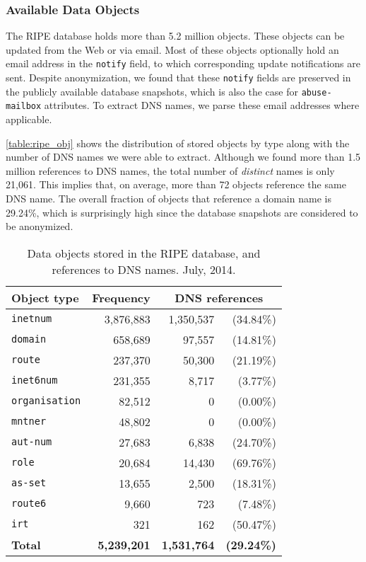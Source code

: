 \documentclass{llncs}
\let\orgautoref\autoref
\renewcommand{\autoref}
{\def\sectionautorefname{Section}\orgautoref}
\begin{document}
\subsubsection{Available Data Objects}
The RIPE database holds more than 5.2 million objects. These objects can be updated from the Web or via email. Most of these objects optionally hold an email address in the \texttt{notify} field, to which corresponding update notifications are sent. Despite anonymization, we found that these \texttt{notify} fields are preserved in the publicly available database snapshots, which is also the case for \texttt{abuse-mailbox} attributes. To extract DNS names, we parse these email addresses where applicable.

\autoref{table:ripe_obj} shows the distribution of stored objects by type along with the number of DNS names we were able to extract. Although we found more than 1.5 million references to DNS names, the total number of \emph{distinct} names is only 21,061. This implies that, on average, more than 72 objects reference the same DNS name. The overall fraction of objects that reference a domain name is 29.24\%, which is surprisingly high since the database snapshots are considered to be anonymized.

\begin{table}[t!]
 \centering
 \begin{tabularx}{0.75\textwidth}{Xrrr}
 \toprule
 \textbf{Object type} & \textbf{Frequency} & \multicolumn{2}{c}{\textbf{DNS references}} \\
 \midrule
 \texttt{inetnum} & 3,876,883 & 1,350,537 & (34.84\%) \\
 \texttt{domain} & 658,689 & 97,557 & (14.81\%) \\
 \texttt{route} & 237,370 & 50,300 & (21.19\%) \\
 \texttt{inet6num} & 231,355 & 8,717 & (3.77\%) \\
 \texttt{organisation} & 82,512 & 0 & (0.00\%) \\
 \texttt{mntner} & 48,802 & 0 & (0.00\%) \\
 \texttt{aut-num} & 27,683 & 6,838 & (24.70\%) \\
 \texttt{role} & 20,684 & 14,430 & (69.76\%) \\
 \texttt{as-set} & 13,655 & 2,500 & (18.31\%) \\
 \texttt{route6} & 9,660 & 723 & (7.48\%) \\
 \texttt{irt} & 321 & 162 & (50.47\%) \\
 \midrule
 \textbf{Total} & \quad \textbf{5,239,201} & \quad \textbf{1,531,764} & \quad \textbf{(29.24\%)} \\
 \bottomrule
 \end{tabularx}
 \vspace{6pt}
 \caption{Data objects stored in the RIPE database, and references to DNS names. July, 2014.}
 \label{table:ripe_obj}
\end{table}
\setlength{\tabcolsep}{6pt}
\end{document}

